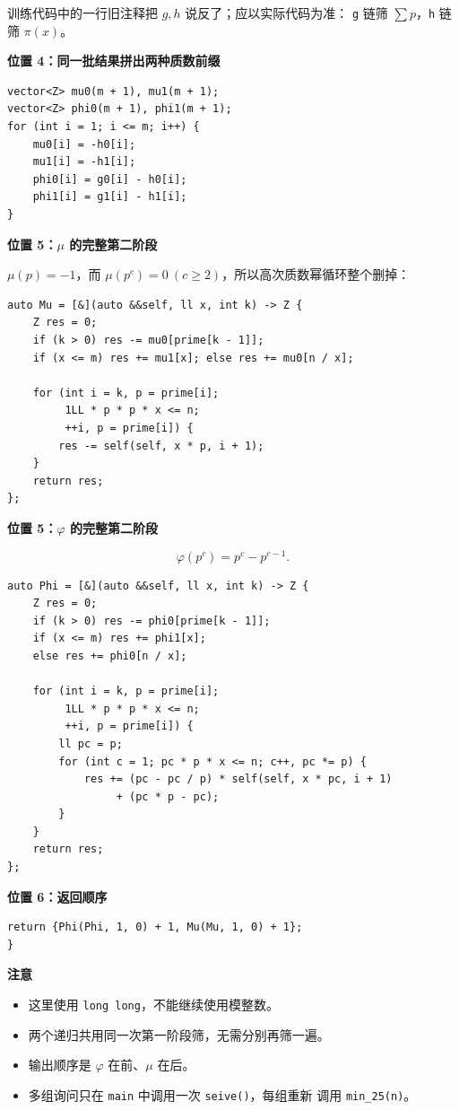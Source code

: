 训练代码中的一行旧注释把 \(g,h\) 说反了；应以实际代码为准：
\texttt{g} 链筛 \(\sum p\)，\texttt{h} 链筛 \(\pi(x)\)。

\textbf{位置 4：同一批结果拼出两种质数前缀}

\begin{verbatim}
vector<Z> mu0(m + 1), mu1(m + 1);
vector<Z> phi0(m + 1), phi1(m + 1);
for (int i = 1; i <= m; i++) {
    mu0[i] = -h0[i];
    mu1[i] = -h1[i];
    phi0[i] = g0[i] - h0[i];
    phi1[i] = g1[i] - h1[i];
}
\end{verbatim}

\textbf{位置 5：\(\mu\) 的完整第二阶段}

\(\mu(p)=-1\)，而 \(\mu(p^c)=0\ (c\ge2)\)，所以高次质数幂循环整个删掉：

\begin{verbatim}
auto Mu = [&](auto &&self, ll x, int k) -> Z {
    Z res = 0;
    if (k > 0) res -= mu0[prime[k - 1]];
    if (x <= m) res += mu1[x]; else res += mu0[n / x];

    for (int i = k, p = prime[i];
         1LL * p * p * x <= n;
         ++i, p = prime[i]) {
        res -= self(self, x * p, i + 1);
    }
    return res;
};
\end{verbatim}

\textbf{位置 5：\(\varphi\) 的完整第二阶段}

\[
\varphi(p^c)=p^c-p^{c-1}.
\]

\begin{verbatim}
auto Phi = [&](auto &&self, ll x, int k) -> Z {
    Z res = 0;
    if (k > 0) res -= phi0[prime[k - 1]];
    if (x <= m) res += phi1[x];
    else res += phi0[n / x];

    for (int i = k, p = prime[i];
         1LL * p * p * x <= n;
         ++i, p = prime[i]) {
        ll pc = p;
        for (int c = 1; pc * p * x <= n; c++, pc *= p) {
            res += (pc - pc / p) * self(self, x * pc, i + 1)
                 + (pc * p - pc);
        }
    }
    return res;
};
\end{verbatim}

\textbf{位置 6：返回顺序}

\begin{verbatim}
return {Phi(Phi, 1, 0) + 1, Mu(Mu, 1, 0) + 1};
}
\end{verbatim}

\textbf{注意}

\begin{itemize}
    \item 这里使用 \texttt{long long}，不能继续使用模整数。
    \item 两个递归共用同一次第一阶段筛，无需分别再筛一遍。
    \item 输出顺序是 \(\varphi\) 在前、\(\mu\) 在后。
    \item 多组询问只在 \texttt{main} 中调用一次 \texttt{seive()}，每组重新
          调用 \texttt{min\_25(n)}。
\end{itemize}

